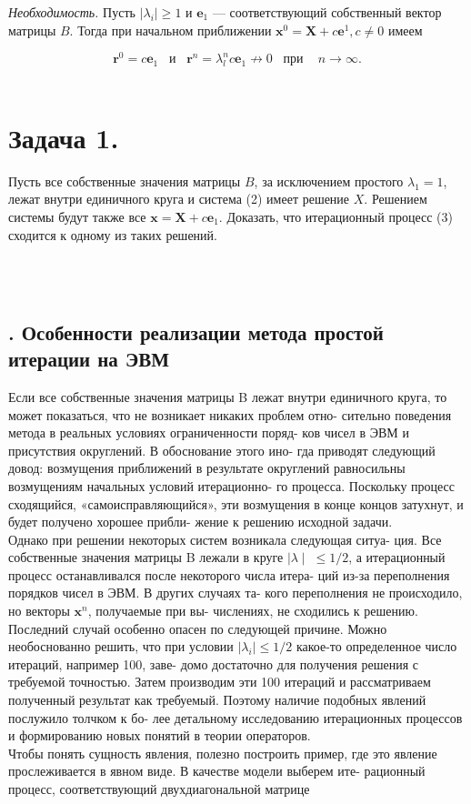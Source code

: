 \documentclass[a4paper, twoside, 12pt]{article}
\begin{document}
\textit{Необходимость.} Пусть $\mid \lambda_{i}\mid \geqslant 1$ и $\textbf{e}_{1}$ — соответствующий собственный вектор матрицы $B$. Тогда при начальном приближении $\textbf{x}^0 = \textbf{X} + c\textbf{e}^1, c \neq 0 $ имеем

\[
\textbf{r}^{0} = c\textbf{e}_{1} \; \; \; \text{и} \; \; \;  \textbf{r}^n = \lambda_{l}^nc\textbf{e}_{1} \nrightarrow 0 \; \; \;  \text{при } \; \; \;   n \to \infty.
\]
\\
\chapter{\textbf{Задача 1. }} 
Пусть все собственные значения матрицы $B$, за исключением простого $\lambda_{1} = 1$, лежат внутри единичного круга и система (2) имеет решение $X$. Решением системы будут также все $\textbf{x} = \textbf{X} + c\textbf{e}_{1}$. Доказать, что итерационный процесс (3) сходится к одному из таких решений.

\\ \\

\begin{center}
    \section*{. Особенности реализации метода простой
итерации на ЭВМ
}
\end{center}
\noindent
Если все собственные значения матрицы B лежат внутри единичного круга, то может показаться, что не возникает никаких проблем отно- сительно поведения метода в реальных условиях ограниченности поряд- ков чисел в ЭВМ и присутствия округлений. В обоснование этого ино- гда приводят следующий довод: возмущения приближений в результате округлений равносильны возмущениям начальных условий итерационно- го процесса. Поскольку процесс сходящийся, «самоисправляющийся», эти возмущения в конце концов затухнут, и будет получено хорошее прибли- жение к решению исходной задачи.
\\
\indent
Однако при решении некоторых систем возникала следующая ситуа- ция. Все собственные значения матрицы B лежали в круге $\mid\lambda\mid \; \leqslant 1/2$, а итерационный процесс останавливался после некоторого числа итера- ций из-за переполнения порядков чисел в ЭВМ. В других случаях та- кого переполнения не происходило, но векторы $\textbf{x}^n$, получаемые при вы- числениях, не сходились к решению. Последний случай особенно опасен по следующей причине. Можно необоснованно решить, что при условии $\mid\lambda_{i}\mid \leqslant 1/2$ какое-то определенное число итераций, например 100, заве- домо достаточно для получения решения с требуемой точностью. Затем производим эти 100 итераций и рассматриваем полученный результат как требуемый. Поэтому наличие подобных явлений послужило толчком к бо- лее детальному исследованию итерационных процессов и формированию новых понятий в теории операторов.
\\
\indent
Чтобы понять сущность явления, полезно построить пример, где это явление прослеживается в явном виде. В качестве модели выберем ите- рационный процесс, соответствующий двухдиагональной матрице
\end{document}
